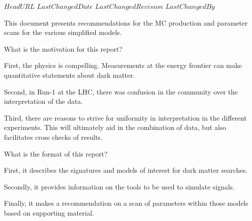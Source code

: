 \svnidlong
{$HeadURL$}
{$LastChangedDate$}
{$LastChangedRevision$}
{$LastChangedBy$}
\pagestyle{fancy}
\fancyhead{}
\fancyhead[ol]{\svnrev;\svndate;\svnauthor}

This document presents recommendations for
the MC production and parameter scans
for the various simplified models.

What is the motivation for this report?

First, the physics is compelling.   Measurements at the energy
frontier can make quantitative statements about dark matter.

Second, in Run-1 at the LHC, there was confusion in the community
over the interpretation of the data.

Third, there are reasons to strive for uniformity in interpretation
in the different experiments.  This will ultimately aid in the
combination of data, but also facilitates cross checks of results.

What is the format of this report?

First, it describes the signatures and models of interest for
dark matter searches.

Secondly, it provides information on the tools to be used to
simulate signals.

Finally, it makes a recommendation on a scan of parameters within
those models based on supporting material.

